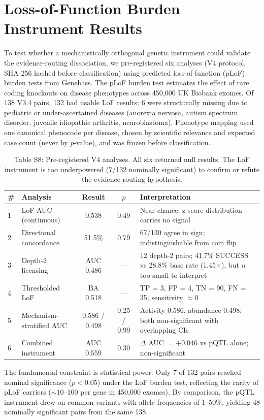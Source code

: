 \documentclass[11pt]{article}
\begin{document}
\clearpage

\section{Loss-of-Function Burden Instrument Results}
\label{supp:lof}

To test whether a mechanistically orthogonal genetic instrument could validate the evidence-routing dissociation, we pre-registered six analyses (V4 protocol, SHA-256 hashed before classification) using predicted loss-of-function (pLoF) burden tests from Genebass. The pLoF burden test estimates the effect of rare coding knockouts on disease phenotypes across 450,000 UK Biobank exomes. Of 138 V3.4 pairs, 132 had usable LoF results; 6 were structurally missing due to pediatric or under-ascertained diseases (anorexia nervosa, autism spectrum disorder, juvenile idiopathic arthritis, neuroblastoma). Phenotype mapping used one canonical phenocode per disease, chosen by scientific relevance and expected case count (never by $p$-value), and was frozen before classification.

\vspace{1em}
\begin{table}[H]
\centering
\caption{Table S8: Pre-registered V4 analyses. All six returned null results. The LoF instrument is too underpowered (7/132 nominally significant) to confirm or refute the evidence-routing hypothesis.}
\label{tab:lof_results}
\small
\begin{tabular}{llccp{4.5cm}}
\toprule
\# & Analysis & Result & $p$ & Interpretation \\
\midrule
1 & LoF AUC (continuous) & 0.538 & 0.49 & Near chance; z-score distribution carries no signal \\
2 & Directional concordance & 51.5\% & 0.79 & 67/130 agree in sign; indistinguishable from coin flip \\
3 & Depth-2 licensing & AUC 0.486 & --- & 12 depth-2 pairs; 41.7\% SUCCESS vs 28.8\% base rate (1.45$\times$), but $n$ too small to interpret \\
4 & Thresholded LoF & BA 0.518 & --- & TP = 3, FP = 4, TN = 90, FN = 35; sensitivity $\approx 0$ \\
5 & Mechanism-stratified AUC & 0.586 / 0.498 & 0.25 / 0.99 & Activity 0.586, abundance 0.498; both non-significant with overlapping CIs \\
6 & Combined instrument & AUC 0.559 & 0.30 & $\Delta$ AUC $= +0.046$ vs pQTL alone; non-significant \\
\bottomrule
\end{tabular}
\end{table}

The fundamental constraint is statistical power. Only 7 of 132 pairs reached nominal significance ($p < 0.05$) under the LoF burden test, reflecting the rarity of pLoF carriers (${\sim}10$--$100$ per gene in 450,000 exomes). By comparison, the pQTL instrument drew on common variants with allele frequencies of 1--50\%, yielding 48 nominally significant pairs from the same 138.
\end{document}
